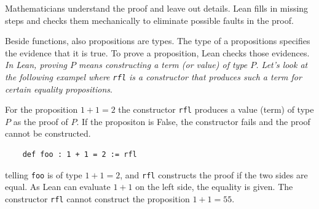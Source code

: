 Mathematicians understand the proof and leave out details. Lean fills in missing steps and checks them mechanically to eliminate possible faults in the 
proof.

Beside functions, also propositions are types. The type of a propositions specifies the evidence that it is true. To prove a proposition, Lean checks 
those evidences. \textit{In Lean, proving $P$ means constructing a term (or value) of type $P$. Let's look at the following exampel where \texttt{rfl} 
is a constructor that produces such a term for certain equality propositions}.

For the proposition $1+1=2$ the constructor \texttt{rfl} produces a value (term) of type $P$ as the proof of $P$. If the propositon is False, the 
constructor fails and the proof cannot be constructed.

\begin{verbatim}
    def foo : 1 + 1 = 2 := rfl  
\end{verbatim}
telling \texttt{foo} is of type $1+1=2$, and \texttt{rfl} constructs the proof if the two sides are equal. As Lean can evaluate $1+1$ on the left side, 
the equality is given. The constructor \texttt{rfl} cannot construct the proposition $1+1=55$. 


